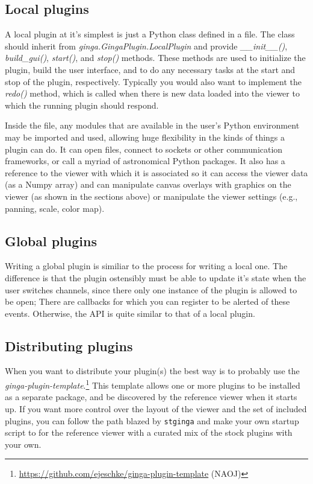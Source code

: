 \documentclass[11pt,twoside]{article}
\begin{document}
\subsection{Local plugins}

A local plugin at it's simplest is just a Python class defined in a file.
The class should inherit from {\em ginga.GingaPlugin.LocalPlugin}
and provide {\em \_\_init\_\_()}, {\em build\_gui()},
{\em start()}, and {\em stop()} methods.
These methods are used to initialize the
plugin, build the user interface, and to do any necessary tasks at the
start and stop of the plugin, respectively. Typically you would also
want to implement the {\em redo()} method, which is called when there is
new data loaded into the viewer to which the running plugin should respond.

Inside the file, any modules that are available in the user's Python
environment may be imported and used, allowing huge flexibility in
the kinds of things a plugin can do.  It can open files, connect to
sockets or other communication frameworks, or call a myriad of
astronomical Python packages.  It also has a reference to the viewer with
which it is associated so it can access the viewer data (as a Numpy array)
and can manipulate canvas overlays with graphics on the viewer (as shown
in the sections above) or manipulate the viewer settings (e.g., panning,
scale, color map).

\subsection{Global plugins}

Writing a global plugin is similiar to the process for writing a local
one.  The difference is that the plugin ostensibly must be able to
update it's state when the user switches channels, since there only
one instance of the plugin is allowed to be open; There are callbacks
for which you can register to be alerted of these events. Otherwise,
the API is quite similar to that of a local plugin.

\subsection{Distributing plugins}

When you want to distribute your plugin(s) the best way is to probably use
the {\em ginga-plugin-template}.\footnote{\url{https://github.com/ejeschke/ginga-plugin-template} (NAOJ)}
This template allows one
or more plugins to be installed as a separate package, and be
discovered by the reference viewer when it starts up.  If you want
more control over the layout of the viewer and the set of included
plugins, you can follow the path blazed by {\tt stginga} and make your own
startup script to for the reference viewer with a curated mix of the
stock plugins with your own.
\end{document}
